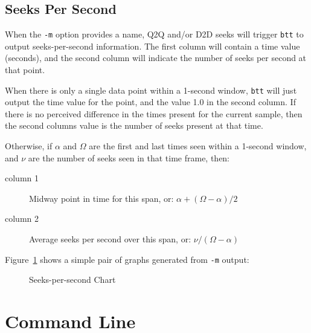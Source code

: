 \documentclass{article}
\begin{document}
\newpage\subsection{\label{sec:sps-spec}Seeks Per Second}

  When the \texttt{-m} option provides a name, Q2Q and/or D2D seeks
  will trigger \texttt{btt} to output seeks-per-second information. The
  first column will contain a time value (seconds), and the second column
  will indicate the number of seeks per second at that point.

  When there is only a single data point within a 1-second window,
  \texttt{btt} will just output the time value for the point, and the
  value 1.0 in the second column. If there is no perceived difference
  in the times present for the current sample, then the second columns
  value is the number of seeks present at that time.

  Otherwise, if $\alpha$ and $\Omega$ are the first and last times
  seen within a 1-second window, and $\nu$ are the number of seeks seen
  in that time frame, then:

  \begin{description}
    \item[column 1] Midway point in time for this span, or: \hfill$\alpha +
    {{(\Omega - \alpha)} / 2}$

    \item[column 2] Average seeks per second over this span, or: \hfill$\nu  /
    {(\Omega - \alpha)}$
  \end{description}

  Figure~\ref{fig:sps} shows a simple pair of graphs generated from
  \texttt{-m} output:

  \begin{figure}[h!]
  \leavevmode\centering
  \caption{\label{fig:sps}Seeks-per-second Chart}
  \end{figure}
  \FloatBarrier

\newpage\section{\label{sec:cmd-line}Command Line}
\end{document}
